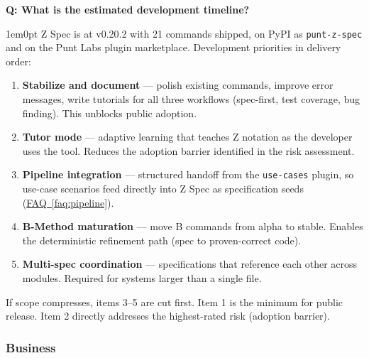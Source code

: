 \documentclass[11pt,letterpaper]{article}
\newcounter{faqnum}
\newenvironment{faqpair}[1]{%
  \needspace{4\baselineskip}%
  \vspace{0.5em}%
  \refstepcounter{faqnum}%
  \noindent\textbf{\color{SectionBlue}Q\thefaqnum: #1}\par\nopagebreak[4]%
  \vspace{0.2em}%
  \begin{adjustwidth}{1em}{0pt}%
  \setlength{\parindent}{0pt}%
}{%
  \end{adjustwidth}%
  \vspace{0.5em}%
}
\newcommand{\faqref}[1]{\hyperref[#1]{FAQ~\ref*{#1}}}
\begin{document}
\begin{faqpair}{What is the estimated development timeline?}\label{faq:timeline}
Z Spec is at v0.20.2 with 21 commands shipped, on PyPI as \texttt{punt-z-spec} and on the Punt Labs plugin marketplace. Development priorities in delivery order:

\begin{enumerate}[nosep]
\item \textbf{Stabilize and document} --- polish existing commands, improve error messages, write tutorials for all three workflows (spec-first, test coverage, bug finding). This unblocks public adoption.
\item \textbf{Tutor mode} --- adaptive learning that teaches Z notation as the developer uses the tool. Reduces the adoption barrier identified in the risk assessment.
\item \textbf{Pipeline integration} --- structured handoff from the \texttt{use-cases} plugin, so use-case scenarios feed directly into Z Spec as specification seeds (\faqref{faq:pipeline}).
\item \textbf{B-Method maturation} --- move B commands from alpha to stable. Enables the deterministic refinement path (spec to proven-correct code).
\item \textbf{Multi-spec coordination} --- specifications that reference each other across modules. Required for systems larger than a single file.
\end{enumerate}

If scope compresses, items 3--5 are cut first. Item 1 is the minimum for public release. Item 2 directly addresses the highest-rated risk (adoption barrier).
\end{faqpair}

\subsubsection*{Business}
\end{document}
